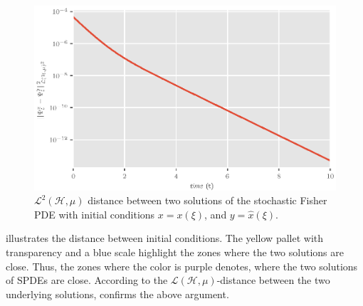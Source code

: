 %
%
%
\begin{figure}[H]
    \includegraphics[width=\textwidth]{StochasticFisherEquation/error_fisher.eps}
    \caption{
        $\mathcal{L}^2(\mathcal{H}, \mu)$
        distance between two solutions of the stochastic Fisher PDE 
        with initial conditions $x = x(\xi)$, and  $y = \widehat{x}(\xi)$.
    }
    \label{fig:errorfisher}
\end{figure}

     illustrates the distance between initial 
conditions. The yellow pallet with transparency and a blue scale highlight the 
zones where the two solutions are close. Thus, the zones where the color is 
purple denotes, where the two solutions of SPDEs are close. 
According to the $\mathcal{L}( \mathcal{H}, \mu)$-distance between the two 
underlying solutions,  confirms the above argument.

%